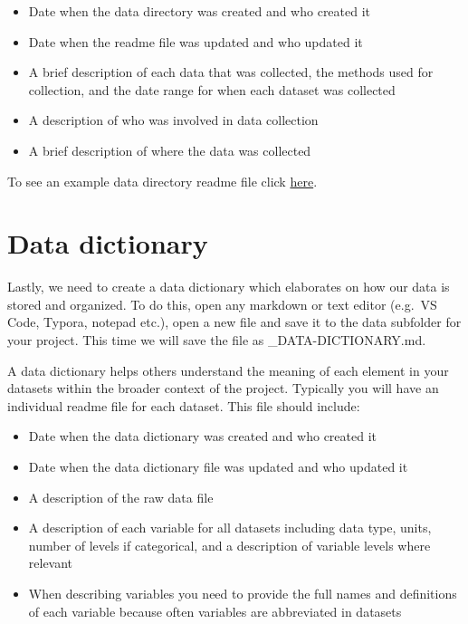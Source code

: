 \documentclass[
]{book}
\providecommand{\tightlist}{%
  \setlength{\itemsep}{0pt}\setlength{\parskip}{0pt}}
\begin{document}
\begin{itemize}
\tightlist
\item
  Date when the data directory was created and who created it
\item
  Date when the readme file was updated and who updated it
\item
  A brief description of each data that was collected, the methods used for collection, and the date range for when each dataset was collected
\item
  A description of who was involved in data collection
\item
  A brief description of where the data was collected
\end{itemize}

To see an example data directory readme file click \href{files/DS_dataREADME.md}{here}.

\hypertarget{data-dictionary}{%
\section{Data dictionary}\label{data-dictionary}}

Lastly, we need to create a data dictionary which elaborates on how our data is stored and organized. To do this, open any markdown or text editor (e.g.~VS Code, Typora, notepad etc.), open a new file and save it to the data subfolder for your project. This time we will save the file as \_DATA-DICTIONARY.md.

A data dictionary helps others understand the meaning of each element in your datasets within the broader context of the project. Typically you will have an individual readme file for each dataset. This file should include:

\begin{itemize}
\tightlist
\item
  Date when the data dictionary was created and who created it
\item
  Date when the data dictionary file was updated and who updated it
\item
  A description of the raw data file
\item
  A description of each variable for all datasets including data type, units, number of levels if categorical, and a description of variable levels where relevant
\item
  When describing variables you need to provide the full names and definitions of each variable because often variables are abbreviated in datasets
\end{itemize}
\end{document}
